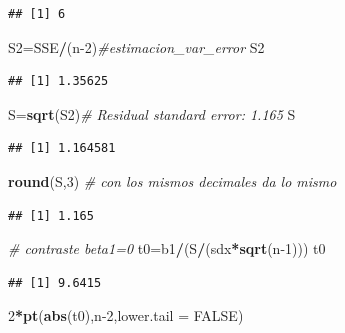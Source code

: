 \documentclass[
]{article}
\newenvironment{Shaded}{\begin{snugshade}}{\end{snugshade}}
\newcommand{\CommentTok}[1]{\textcolor[rgb]{0.56,0.35,0.01}{\textit{#1}}}
\newcommand{\DataTypeTok}[1]{\textcolor[rgb]{0.13,0.29,0.53}{#1}}
\newcommand{\DecValTok}[1]{\textcolor[rgb]{0.00,0.00,0.81}{#1}}
\newcommand{\KeywordTok}[1]{\textcolor[rgb]{0.13,0.29,0.53}{\textbf{#1}}}
\newcommand{\NormalTok}[1]{#1}
\newcommand{\OperatorTok}[1]{\textcolor[rgb]{0.81,0.36,0.00}{\textbf{#1}}}
\newcommand{\OtherTok}[1]{\textcolor[rgb]{0.56,0.35,0.01}{#1}}
\begin{document}
\begin{verbatim}
## [1] 6
\end{verbatim}

\begin{Shaded}
\begin{Highlighting}[]
\NormalTok{S2=SSE}\OperatorTok{/}\NormalTok{(n}\DecValTok{-2}\NormalTok{)}\CommentTok{#estimacion_var_error}
\NormalTok{S2}
\end{Highlighting}
\end{Shaded}

\begin{verbatim}
## [1] 1.35625
\end{verbatim}

\begin{Shaded}
\begin{Highlighting}[]
\NormalTok{S=}\KeywordTok{sqrt}\NormalTok{(S2)}\CommentTok{# Residual standard error: 1.165}
\NormalTok{S}
\end{Highlighting}
\end{Shaded}

\begin{verbatim}
## [1] 1.164581
\end{verbatim}

\begin{Shaded}
\begin{Highlighting}[]
\KeywordTok{round}\NormalTok{(S,}\DecValTok{3}\NormalTok{) }\CommentTok{# con los mismos decimales da lo mismo}
\end{Highlighting}
\end{Shaded}

\begin{verbatim}
## [1] 1.165
\end{verbatim}

\begin{Shaded}
\begin{Highlighting}[]
 \CommentTok{# contraste beta1=0}
\NormalTok{t0=b1}\OperatorTok{/}\NormalTok{(S}\OperatorTok{/}\NormalTok{(sdx}\OperatorTok{*}\KeywordTok{sqrt}\NormalTok{(n}\DecValTok{-1}\NormalTok{)))}
\NormalTok{t0}
\end{Highlighting}
\end{Shaded}

\begin{verbatim}
## [1] 9.6415
\end{verbatim}

\begin{Shaded}
\begin{Highlighting}[]
\DecValTok{2}\OperatorTok{*}\KeywordTok{pt}\NormalTok{(}\KeywordTok{abs}\NormalTok{(t0),n}\DecValTok{-2}\NormalTok{,}\DataTypeTok{lower.tail =} \OtherTok{FALSE}\NormalTok{)}
\end{Highlighting}
\end{Shaded}
\end{document}
